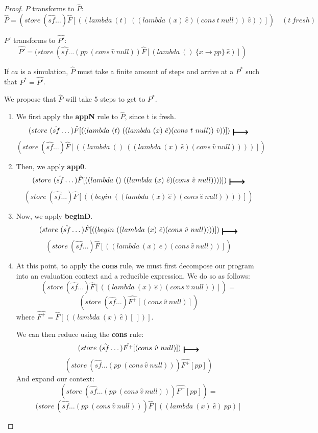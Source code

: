\begin{proof}
$P$ transforms to $\hat{P}$:
\[
\hat{P} = (store\ (\hat{sf} \dots) \hat{F}[((lambda\ (t)\ ((lambda\ (x)\ \hat{e})(cons\ t\ null))\ \hat{v}))]) \quad (t\ fresh)
\]

$P'$ transforms to $\hat{P'}$:
\[
\hat{P'} = (store\ (\hat{sf} \dots (pp\ (cons\ \hat{v}\ null)) \hat{F}[(lambda\ ()\ \{x \xrightarrow{} pp\}\ \hat{e})])
\]

If $ca$ is a simulation, $\hat{P}$ must take a finite amount of steps and arrive at a $P^{*}$ such that $P^{*} = \hat{P'}$.

We propose that $\hat{P}$ will take 5 steps to get to $P^{*}$.
\begin{enumerate}
    \item We first apply the \textbf{appN} rule to $\hat{P}$, since t is fresh.
    \[
    (store\ (\hat{sf} \dots) \hat{F}[((lambda\ (t)\ ((lambda\ (x)\  \hat{e})(cons\ t\ null))\ \hat{v}))])\ \step
    \]
    \[
    (store\ (\hat{sf} \dots) \hat{F}[((lambda\ ()\ ((lambda\ (x)\  \hat{e})(cons\ \hat{v}\ null))))])
    \]
    \item Then, we apply \textbf{app0}.
    \[
    (store\ (\hat{sf} \dots) \hat{F}[((lambda\ ()\ ((lambda\ (x)\  \hat{e})(cons\ \hat{v}\ null))))])\ \step
    \]
    \[
    (store\ (\hat{sf} \dots) \hat{F}[((begin\ ((lambda\ (x)\  \hat{e})(cons\ \hat{v}\ null))))])
    \]
    \item Now, we apply \textbf{beginD}.
    \[
    (store\ (\hat{sf} \dots) \hat{F}[((begin\ ((lambda\ (x)\  \hat{e})(cons\ \hat{v}\ null))))])\ \step
    \]
    \[
    (store\ (\hat{sf} \dots) \hat{F}[((lambda\ (x)\  \hat{e})(cons\ \hat{v}\ null))])
    \]
    \item At this point, to apply the \textbf{cons} rule, we must first decompose our program into an evaluation context and a reducible expression. We do so as follows:
    \[
    (store\ (\hat{sf} \dots) \hat{F}[((lambda\ (x)\  \hat{e})(cons\ \hat{v}\ null))]) = 
    \]
    \[
    (store\ (\hat{sf} \dots) \hat{F^{+}}[(cons\ \hat{v}\ null)])
    \]
    where $\hat{F^{+}} = \hat{F}[((lambda\ (x)\ \hat{e})[\ ])]$.
    
    We can then reduce using the \textbf{cons} rule:
    \[
    (store\ (\hat{sf} \dots) \hat{F^{+}}[(cons\ \hat{v}\ null)])\ \step
    \]
    \[
    (store\ (\hat{sf} \dots (pp\ (cons\ \hat{v}\ null))) \hat{F^{+}}[pp])
    \]
    And expand our context:
    \[
    (store\ (\hat{sf} \dots (pp\ (cons\ \hat{v}\ null))) \hat{F^{+}}[pp]) = 
    \]
    \[
    (store\ (\hat{sf} \dots (pp\ (cons\ \hat{v}\ null)))\hat{F}[((lambda\ (x)\ \hat{e})\ pp)]
    \]
    

\end{enumerate}
\end{proof}
